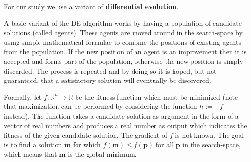 For our study we use a variant of \textbf{differential evolution}.

A basic variant of the DE algorithm works by having a population of candidate solutions (called agents). These agents are moved around in the search-space by using simple mathematical formulae to combine the positions of existing agents from the population. If the new position of an agent is an improvement then it is accepted and forms part of the population, otherwise the new position is simply discarded. The process is repeated and by doing so it is hoped, but not guaranteed, that a satisfactory solution will eventually be discovered.

Formally, let $f: \mathbb{R}^n \rightarrow \mathbb{R}$ be the fitness function which must be minimized (note that maximization can be performed by considering the function $h:=-f$ instead). The function takes a candidate solution as argument in the form of a vector of real numbers and produces a real number as output which indicates the fitness of the given candidate solution. The gradient of $f$ is not known. The goal is to find a solution $\mathbf{m}$ for which $f(\mathbf{m}) \leq f(\mathbf{p})$ for all $\mathbf{p}$ in the search-space, which means that $\mathbf{m}$ is the global minimum.

